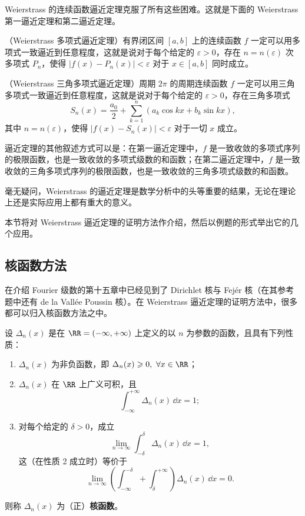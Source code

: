 Weierstrass 的连续函数逼近定理克服了所有这些困难。这就是下面的 Weierstrass 第一逼近定理和第二逼近定理。

\begin{xproposition}[16.3.1]
（Weierstrass 多项式逼近定理）有界闭区间 $[a,b]$ 上的连续函数 $f$ 一定可以用多项式一致逼近到任意程度，这就是说对于每个给定的 $\varepsilon>0$，存在 $n=n(\varepsilon)$ 次多项式 $P_n$，使得 $|f(x)-P_n(x)|<\varepsilon$ 对于 $x\in[a,b]$ 同时成立。
\end{xproposition}

\begin{xproposition}[16.3.2]
（Weierstrass 三角多项式逼近定理）周期 $2\pi$ 的周期连续函数 $f$ 一定可以用三角多项式一致逼近到任意程度，这就是说对于每个给定的 $\varepsilon>0$，存在三角多项式
\[
  S_n(x)=\frac{a_0}{2}+\sum_{k=1}^n(a_k\cos kx+b_k\sin kx),
\]
其中 $n=n(\varepsilon)$，使得 $|f(x)-S_n(x)|<\varepsilon$ 对于一切 $x$ 成立。
\end{xproposition}

\begin{xremark}
逼近定理的其他叙述方式可以是：在第一逼近定理中，$f$ 是一致收敛的多项式序列的极限函数，也是一致收敛的多项式级数的和函数；在第二逼近定理中，$f$ 是一致收敛的三角多项式序列的极限函数，也是一致收敛的三角多项式级数的和函数。
\end{xremark}

毫无疑问，Weierstrass 的逼近定理是数学分析中的头等重要的结果，无论在理论上还是实际应用上都有重大的意义。

本节将对 Weierstrass 逼近定理的证明方法作介绍，然后以例题的形式举出它的几个应用。

\subsection{核函数方法}

在介绍 Fourier 级数的第十五章中已经见到了 Dirichlet 核与 Fejér 核（在其参考题中还有 de la Vallée Poussin 核）。在 Weierstrass 逼近定理的证明方法中，很多都可以归入核函数方法之中。

\begin{xdefinition}
设 $\Delta_n(x)$ 是在 $\RR=(-\infty,+\infty)$ 上定义的以 $n$ 为参数的函数，且具有下列性质：
\begin{enumerate}[label=\arabic*.]
\item $\Delta_n(x)$ 为非负函数，即 $\Delta_n(x)\geqslant0,\ \forall x\in\RR$；
\item $\Delta_n(x)$ 在 $\RR$ 上广义可积，且
\[
  \int_{-\infty}^{+\infty}\Delta_n(x)\,\dd x=1;
\]
\item 对每个给定的 $\delta>0$，成立
\[
  \lim_{n\to\infty}\int_{-\delta}^{\delta}\Delta_n(x)\,\dd x=1,
\]
这（在性质 2 成立时）等价于
\[
  \lim_{n\to\infty}\left(\int_{-\infty}^{-\delta}+\int_{\delta}^{+\infty}\right)
  \Delta_n(x)\,\dd x=0.
\]
\end{enumerate}
则称 $\Delta_n(x)$ 为（正）\textbf{核函数}。
\end{xdefinition}

